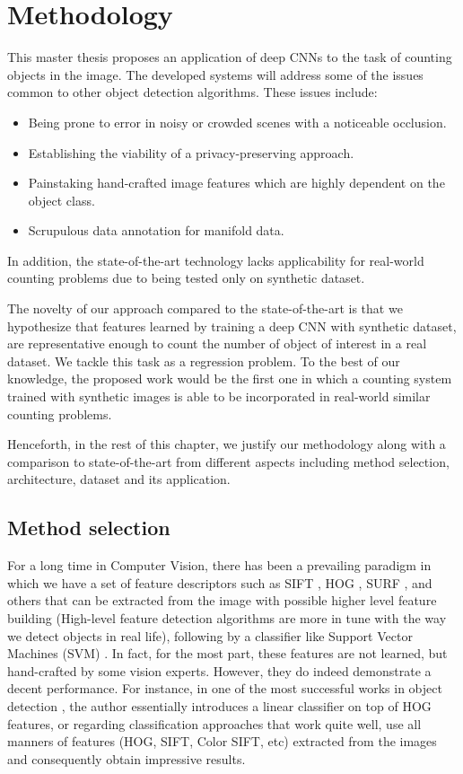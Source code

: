 \newpage
\chapter{Methodology}
\label{sec:proposal}
\noindent
This master thesis proposes an application of deep CNNs to the task of counting objects in the image. The developed systems will address some of the issues common to other object detection algorithms. These issues include:
\begin{itemize}
	\item Being prone to error in noisy or crowded scenes with a noticeable occlusion. 
	\item Establishing the viability of a privacy-preserving approach. 
	\item Painstaking hand-crafted image features which are highly dependent on the object class. 
	\item Scrupulous data annotation for manifold data. 
\end{itemize} 
In addition, the state-of-the-art \cite{segui2015learning} technology lacks applicability for real-world counting problems due to being tested only on synthetic dataset.

The novelty of our approach compared to the state-of-the-art is that we hypothesize that features learned by training a  deep CNN with synthetic dataset, are representative enough to count the number of object of interest in a real dataset. We tackle this task as a regression problem. 
To the best of our knowledge, the proposed work would be the first one in which a counting system trained with synthetic images is able to be incorporated in real-world similar counting problems.

Henceforth, in the rest of this chapter, we justify our methodology along with a comparison to state-of-the-art from different aspects including method selection, architecture, dataset and its application.   


\section{Method selection}

For a long time in Computer Vision, there has been a prevailing paradigm in which we have a set of feature descriptors such as SIFT \cite{lowe1999object}, HOG \cite{dalal2005histograms}, SURF \cite{bay2006surf}, and others that can be extracted from the image with possible higher level feature building (High-level feature detection algorithms are more in tune with the way we detect objects in real life), following by a classifier like Support Vector Machines (SVM) \cite{vapnik1964note, boser1992training}. In fact, for the most part, these features are not learned, but hand-crafted by some vision experts. However, they do indeed demonstrate a decent performance. For instance, in one of the most successful works in object detection \cite{felzenszwalb2010object}, the author essentially introduces a linear classifier on top of HOG features, or regarding classification approaches that work quite well, \citeauthor{yu2010object} use all manners of features (HOG, SIFT, Color SIFT, etc) extracted from the images and consequently obtain impressive results. 


